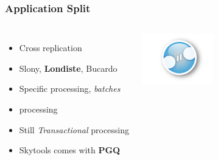 \documentclass[english]{beamer}
\begin{document}
\begin{frame}[fragile]
  \frametitle{Application Split}

  \linebreak

\begin{columns}[c]

  \begin{itemize}
   \item<1-> Cross replication
   \item<2-> Slony, \textbf{Londiste}, Bucardo
   \item<3-> Specific processing, \textit{batches}
   \item<3->  processing
   \item<3-> Still \textit{Transactional} processing
   \item<4-> Skytools comes with \alert{\textbf{PGQ}}
  \end{itemize}  

\includegraphics[height=6em]{cross-replication.jpg}
\end{columns}
\end{frame}

\end{document}
